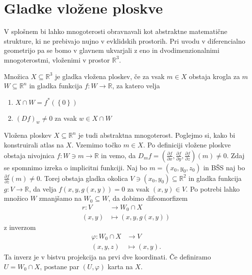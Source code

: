 \section{Gladke vložene ploskve}%
\label{sec:Gladke_vložene_ploskve}

V splošnem bi lahko mnogoterosti obravnavali kot abstraktne
matematične strukture, ki ne prebivajo nujno v evklidskih
prostorih. Pri uvodu v diferencialno geometrijo pa se bomo v
glavnem ukvarjali z eno in dvodimenzionalnimi mnogoterostmi,
vloženimi v prostor $\mathbb{R}^3$. 

\begin{definicija}
\label{def_gladka_vložena_ploskev} Množica
$X \subseteq \mathbb{R}^3$ je gladka vložena ploskev, če
za vsak $m \in  X$ obstaja krogla za $m$ $W \subseteq
\mathbb{R}^n$ in gladka funkcija $f : W \to \mathbb{R}$,
za katero velja 
\begin{enumerate} \item $X \cap W =
f^{*}\left( \left\{ 0\right\}  \right)$ \item $\left(
Df \right)_w \neq 0 $ za vsak $w \in X \cap  W$  
\end{enumerate}    
\end{definicija}

Vložena ploskev $X \subseteq  \mathbb{R}^n$ je tudi abstraktna
mnogoterost. Poglejmo si, kako bi konstruirali atlas na $X$.
Vzemimo točko $m \in  X$. Po definiciji vložene ploskve
obstaja nivojnica $f: W \ni m \to \mathbb{R}$ in vemo, da
$D_mf = \left( \frac{ \partial f }{ \partial x } , \frac{
\partial f }{ \partial y }  , \frac{ \partial f }{ \partial z
} \right)\left( m \right) \neq 0$. Zdaj se spomnimo izreka o
implicitni funkciji. Naj bo $m = \left( x_0, y_0 , z_0 \right)$ in
BŠS naj bo $\frac{ \partial f }{ \partial z }\left( m \right) \neq
0$. Torej obstaja gladka okolica $V \ni \left( x_0, y_0 \right)
\subseteq \mathbb{R}^2$  in gladka funkcija $g: V \to \mathbb{R}$,
da velja $f\left( x, y, g\left( x,y \right) \right) = 0$  za vsak
$\left( x,y \right) \in  V$. Po potrebi lahko množico $W$
zmanjšamo na $W_0 \subseteq  W$, da dobimo difeomorfizem
\begin{align*} r: V &\longrightarrow W_0 \cap  X \\ \left( x,y
\right) &\longmapsto \left( x,y,g\left( x,y \right) \right)
\end{align*} z inverzom \begin{align*} \varphi: W_0 \cap X
&\longrightarrow V \\ \left( x,y,z \right)
&\longmapsto \left( x,y \right). \end{align*}Ta inverz
je v bistvu projekcija na prvi dve koordinati. Če
definiramo $U = W_0 \cap  X$, postane par $\left( U,
\varphi \right)$ karta na $X$.  


